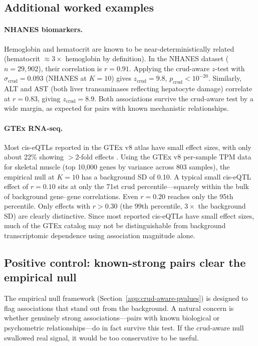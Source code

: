 \subsection{Additional worked examples}
\label{app:additional-examples}

\paragraph{NHANES biomarkers.} Hemoglobin and hematocrit are known to be near-deterministically related (hematocrit $\approx 3\times$ hemoglobin by definition). In the NHANES dataset ($n = 29{,}902$), their correlation is $r = 0.91$. Applying the crud-aware $z$-test with $\sigma_{\mathrm{crud}} = 0.093$ (NHANES at $K=10$) gives $z_{\mathrm{crud}} = 9.8$, $p_{\mathrm{crud}} < 10^{-20}$. Similarly, ALT and AST (both liver transaminases reflecting hepatocyte damage) correlate at $r = 0.83$, giving $z_{\mathrm{crud}} = 8.9$. Both associations survive the crud-aware test by a wide margin, as expected for pairs with known mechanistic relationships.

\paragraph{GTEx RNA-seq.} Most cis-eQTLs reported in the GTEx v8 atlas have small effect sizes, with only about 22\% showing $>$2-fold effects \citep{gtex2020}. Using the GTEx v8 per-sample TPM data for skeletal muscle (top 10,000 genes by variance across 803 samples), the empirical null at $K=10$ has a background SD of 0.10. A typical small cis-eQTL effect of $r=0.10$ sits at only the 71st crud percentile---squarely within the bulk of background gene--gene correlations. Even $r=0.20$ reaches only the 95th percentile. Only effects with $r>0.30$ (the 99th percentile, $3\times$ the background SD) are clearly distinctive. Since most reported cis-eQTLs have small effect sizes, much of the GTEx catalog may not be distinguishable from background transcriptomic dependence using association magnitude alone.

\subsection{Positive control: known-strong pairs clear the empirical null}
\label{app:positive-control}

The empirical null framework (Section~\ref{app:crud-aware-pvalues}) is designed to
flag associations that stand out from the background. A natural concern is whether genuinely
strong associations---pairs with known biological or psychometric relationships---do in fact
survive this test. If the crud-aware null swallowed real signal, it would be too
conservative to be useful.

